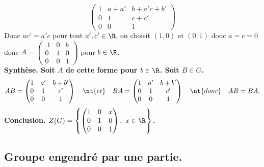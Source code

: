 \documentclass[11pt]{article}
\begin{document}
\begin{ex}{}{}
\begin{equation*}
\begin{pmatrix}
            1&a+a'&b+a'c+b'\\
            0&1&c+c'\\
            0&0&1
        \end{pmatrix}
    \end{equation*}
    Donc $ac'=a'c$ pour tout $a',c'\in\R$, on choisit $(1,0)$ et $(0,1)$ donc $a=c=0$ donc $A=\begin{pmatrix}.
        1&0&b\\
        0&1&0\\
        0&0&1
    \end{pmatrix}$ pour $b\in\R$.\\
    \bf{Synthèse.} Soit $A$ de cette forme pour $b\in\R$. Soit $B\in G$.
    \begin{equation*}
        AB=\begin{pmatrix}
            1&a'&b+b'\\
            0&1&c'\\
            0&0&1
        \end{pmatrix} \quad\nt{et}\quad BA=\begin{pmatrix}
            1&a'&b+b'\\
            0&1&c'\\
            0&0&1
        \end{pmatrix} \quad\nt{donc}\quad AB=BA.
    \end{equation*}
    \bf{Conclusion.} $Z(G) =\left\{ \begin{pmatrix}
    1&0&x\\
    0&1&0\\
    0&0&1
    \end{pmatrix}, ~ x \in \R \right\}$.
\end{ex}

\vspace*{-0.7cm}

\subsection{Groupe engendré par une partie.}
\end{document}
